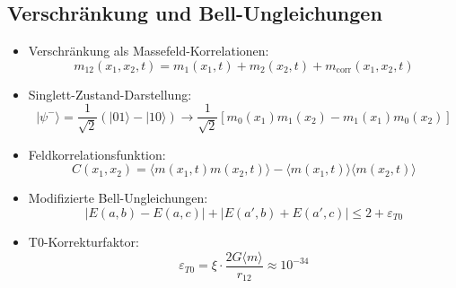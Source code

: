 \documentclass[12pt,a4paper]{article}
\begin{document}
	\subsection{Verschränkung und Bell-Ungleichungen}
	\begin{itemize}
		\item Verschränkung als Massefeld-Korrelationen:
		\begin{equation}
			m_{12}(x_1,x_2,t) = m_1(x_1,t) + m_2(x_2,t) + m_{\text{corr}}(x_1,x_2,t)
		\end{equation}
		
		\item Singlett-Zustand-Darstellung:
		\begin{equation}
			|\psi^-\rangle = \frac{1}{\sqrt{2}}(|01\rangle - |10\rangle) \rightarrow \frac{1}{\sqrt{2}}[m_0(x_1)m_1(x_2) - m_1(x_1)m_0(x_2)]
		\end{equation}
		
		\item Feldkorrelationsfunktion:
		\begin{equation}
			C(x_1,x_2) = \langle m(x_1,t) m(x_2,t) \rangle - \langle m(x_1,t) \rangle \langle m(x_2,t) \rangle
		\end{equation}
		
		\item Modifizierte Bell-Ungleichungen:
		\begin{equation}
			|E(a,b) - E(a,c)| + |E(a',b) + E(a',c)| \leq 2 + \varepsilon_{T0}
		\end{equation}
		
		\item T0-Korrekturfaktor:
		\begin{equation}
			\varepsilon_{T0} = \xi \cdot \frac{2G\langle m \rangle}{r_{12}} \approx 10^{-34}
		\end{equation}
	\end{itemize}
	
\end{document}
